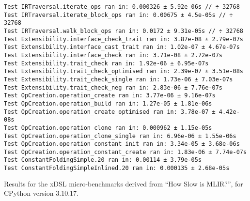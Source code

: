 \begin{code}
    \begin{verbatim}
Test IRTraversal.iterate_ops ran in: 0.000326 ± 5.92e-06s // ÷ 32768
Test IRTraversal.iterate_block_ops ran in: 0.00675 ± 4.5e-05s // ÷ 32768
Test IRTraversal.walk_block_ops ran in: 0.0172 ± 9.31e-05s // ÷ 32768
Test Extensibility.interface_check_trait ran in: 3.87e-08 ± 2.79e-07s
Test Extensibility.interface_cast_trait ran in: 1.02e-07 ± 4.67e-07s
Test Extensibility.interface_check ran in: 3.71e-08 ± 2.72e-07s
Test Extensibility.trait_check ran in: 1.92e-06 ± 6.95e-07s
Test Extensibility.trait_check_optimised ran in: 2.39e-07 ± 3.51e-08s
Test Extensibility.trait_check_single ran in: 1.73e-06 ± 7.03e-07s
Test Extensibility.trait_check_neg ran in: 2.83e-06 ± 7.76e-07s
Test OpCreation.operation_create ran in: 3.77e-06 ± 9.16e-07s
Test OpCreation.operation_build ran in: 1.27e-05 ± 1.81e-06s
Test OpCreation.operation_create_optimised ran in: 3.78e-07 ± 4.42e-08s
Test OpCreation.operation_clone ran in: 0.000962 ± 1.15e-05s
Test OpCreation.operation_clone_single ran in: 6.96e-06 ± 1.55e-06s
Test OpCreation.operation_constant_init ran in: 3.34e-05 ± 3.68e-06s
Test OpCreation.operation_constant_create ran in: 1.83e-06 ± 7.74e-07s
Test ConstantFoldingSimple.20 ran in: 0.00114 ± 3.79e-05s
Test ConstantFoldingSimpleInlined.20 ran in: 0.000135 ± 2.68e-05s
    \end{verbatim}
    \caption{Results for the xDSL micro-benchmarks derived from ``How Slow is MLIR?'', for CPython version 3.10.17.}
    \label{listing:how-slow-is-mlir-xdsl-microbenchmark-results-310}
\end{code}
%
